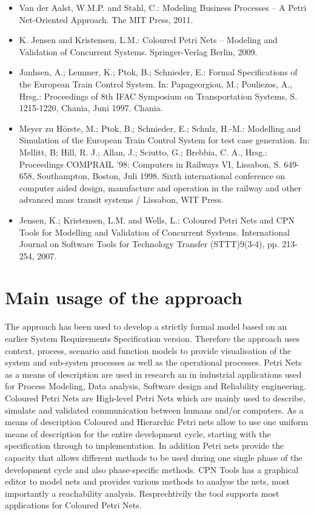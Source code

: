 \begin{itemize}
\item Van der Aalst, W.M.P. and Stahl, C.: Modeling Business Processes -- A Petri Net-Oriented Approach. The MIT Press, 2011.
\item K. Jensen and Kristensen, L.M.: Coloured Petri Nets -- Modeling and Validation of Concurrent Systems. Springer-Verlag Berlin, 2009.
\item Janhsen, A.; Lemmer, K.; Ptok, B.; Schnieder, E.: Formal Specifications of the European Train Control System. In: Papageorgiou, M.; Pouliezos, A., Hrsg.: Proceedings of 8th IFAC Symposium on Transportation Systems, S. 1215-1220, Chania, Juni 1997. Chania.
\item Meyer zu Hörste, M.; Ptok, B.; Schnieder, E.; Schulz, H.-M.: Modelling and Simulation of the European Train Control System for test case generation. In: Mellitt, B; Hill, R. J.; Allan, J.; Sciutto, G.; Brebbia, C. A., Hrsg.: Proceedings COMPRAIL '98: Computers in Railways VI, Lissabon, S. 649-658, Southampton, Boston, Juli 1998. Sixth international conference on computer aided design, manufacture and operation in the railway and other advanced mass transit systems / Lissabon, WIT Press.
\item Jensen, K.; Kristensen, L.M. and Wells, L.: Coloured Petri Nets and CPN Tools for Modelling and Validation of Concurrent Systems. International Journal on Software Tools for Technology Transfer (STTT)9(3-4), pp. 213-254, 2007. 
\end{itemize}


\section{Main usage of the approach}
\label{main_usage}
The approach has been used to develop a strictly formal model based on an earlier  System  Requirements  Specification version. Therefore the approach uses context, process, scenario and function models to provide visualisation of the system and sub-systen processes as well as the operational processes. 
Petri Nets as a means of description are used in research an in industrial applications used for Process Modeling, Data analysis, Software design and Reliability engineering. Coloured Petri Nets are  High-level Petri Nets which are mainly used to describe, simulate and validated communication between humans and/or computers. As a means of description Coloured and  Hierarchic Petri nets allow to use one uniform means of description for the entire development cycle, starting with  the specification through to  implementation. In addition Petri  nets  provide  the capacity  that allows  different  methods  to  be  used  during  one  single  phase  of  the  development cycle  and also phase-specific methods.
CPN Tools has a graphical editor to model nets and provides various methods to analyse the nets, most importantly a reachability analysis. Resprechtivily the tool supports most applications for Coloured Petri Nets.

